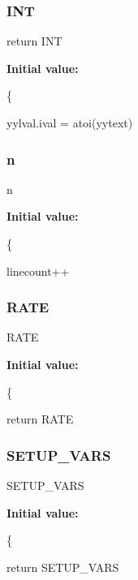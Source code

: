 \subsubsection{\texorpdfstring{I\+NT}{INT}}
{\footnotesize\ttfamily return I\+NT}

{\bfseries Initial value\+:}
\begin{DoxyCode}
\{ 
                 
                 yylval.ival = atoi(yytext)
\end{DoxyCode}
\mbox{\label{parser_8l_aeab71244afb687f16d8c4f5ee9d6ef0e}} 
\subsubsection{\texorpdfstring{n}{n}}
{\footnotesize\ttfamily n}

{\bfseries Initial value\+:}
\begin{DoxyCode}
\{
                 
                 linecount++
\end{DoxyCode}
\mbox{\label{parser_8l_a658796715a99a9373eccd0e98fda6398}} 
\subsubsection{\texorpdfstring{R\+A\+TE}{RATE}}
{\footnotesize\ttfamily R\+A\+TE}

{\bfseries Initial value\+:}
\begin{DoxyCode}
\{ 
                 
                 \textcolor{keywordflow}{return} RATE
\end{DoxyCode}
\mbox{\label{parser_8l_ab56098dd1a912da3e319d2c2ce3fae9f}} 
\subsubsection{\texorpdfstring{S\+E\+T\+U\+P\+\_\+\+V\+A\+RS}{SETUP\_VARS}}
{\footnotesize\ttfamily S\+E\+T\+U\+P\+\_\+\+V\+A\+RS}

{\bfseries Initial value\+:}
\begin{DoxyCode}
\{ 
                 
                 \textcolor{keywordflow}{return} SETUP\_VARS
\end{DoxyCode}
